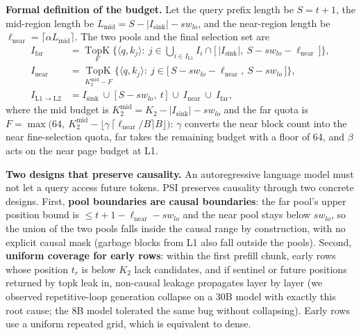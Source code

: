 \documentclass[11pt]{article}
\begin{document}
\textbf{Formal definition of the budget.} Let the query prefix length be $S=t+1$, the mid-region length be $L_{\mathrm{mid}}=S-|I_{\mathrm{sink}}|-sw_{lo}$, and the near-region length be $\ell_{\mathrm{near}}=\lceil\alpha L_{\mathrm{mid}}\rceil$. The two pools and the final selection set are
\begin{align}
I_{\mathrm{far}} &= \operatorname*{TopK}_{F}\Big\{\langle q,k_j\rangle:\ j\in\bigcup\nolimits_{i\in I_{\mathrm{L1}}} I_i\cap\big[\,|I_{\mathrm{sink}}|,\ S-sw_{lo}-\ell_{\mathrm{near}}\,\big]\Big\},\\
I_{\mathrm{near}} &= \operatorname*{TopK}_{K_2^{\mathrm{mid}}-F}\Big\{\langle q,k_j\rangle:\ j\in\big[\,S-sw_{lo}-\ell_{\mathrm{near}},\ S-sw_{lo}\,\big]\Big\},\\
I_{\mathrm{L1}\rightarrow\mathrm{L2}} &= I_{\mathrm{sink}}\ \cup\ \big[\,S-sw_{lo},\ t\,\big]\ \cup\ I_{\mathrm{near}}\ \cup\ I_{\mathrm{far}},
\end{align}
where the mid budget is $K_2^{\mathrm{mid}}=K_2-|I_{\mathrm{sink}}|-sw_{lo}$ and the far quota is $F=\max\big(64,\ K_2^{\mathrm{mid}}-\lfloor\gamma\,\lceil\ell_{\mathrm{near}}/B\rceil B\rfloor\big)$: $\gamma$ converts the near block count into the near fine-selection quota, far takes the remaining budget with a floor of 64, and $\beta$ acts on the near page budget at L1.

\textbf{Two designs that preserve causality.} An autoregressive language model must not let a query access future tokens. PSI preserves causality through two concrete designs. First, \textbf{pool boundaries are causal boundaries}: the far pool's upper position bound is $\leq t+1-\ell_{\mathrm{near}}-sw_{lo}$ and the near pool stays below $sw_{lo}$, so the union of the two pools falls inside the causal range by construction, with no explicit causal mask (garbage blocks from L1 also fall outside the pools). Second, \textbf{uniform coverage for early rows}: within the first prefill chunk, early rows whose position $t_r$ is below $K_2$ lack candidates, and if sentinel or future positions returned by topk leak in, non-causal leakage propagates layer by layer (we observed repetitive-loop generation collapse on a 30B model with exactly this root cause; the 8B model tolerated the same bug without collapsing). Early rows use a uniform repeated grid, which is equivalent to dense.
\end{document}
